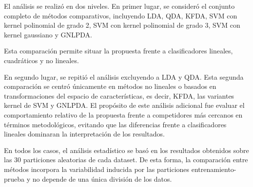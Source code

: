 El análisis se realizó en dos niveles. En primer lugar, se consideró el conjunto completo de métodos comparativos, incluyendo LDA, QDA, KFDA, SVM con kernel polinomial de grado 2, SVM con kernel polinomial de grado 3, SVM con kernel gaussiano y GNLPDA.

Esta comparación permite situar la propuesta frente a clasificadores lineales, cuadráticos y no lineales.

En segundo lugar, se repitió el análisis excluyendo a LDA y QDA. Esta segunda comparación se centró únicamente en métodos no lineales o basados en transformaciones del espacio de características, es decir, KFDA, las variantes kernel de SVM y GNLPDA. El propósito de este análisis adicional fue evaluar el comportamiento relativo de la propuesta frente a competidores más cercanos en términos metodológicos, evitando que las diferencias frente a clasificadores lineales dominaran la interpretación de los resultados.

En todos los casos, el análisis estadístico se basó en los resultados obtenidos sobre las 30 particiones aleatorias de cada dataset. De esta forma, la comparación entre métodos incorpora la variabilidad inducida por las particiones entrenamiento-prueba y no depende de una única división de los datos.

